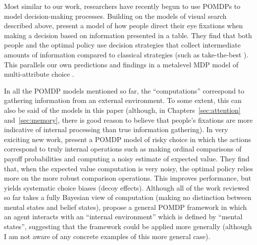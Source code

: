 Most similar to our work, researchers have recently begun to use POMDPs to model decision-making processes. Building on the models of visual search described above, \citet{chen2017cognitive} present a model of how people direct their eye fixations when making a decision based on information presented in a table. They find that both people and the optimal policy use decision strategies that collect intermediate amounts of information compared to classical strategies (such as take-the-best \citealp{gigerenzer1996reasoning}). This parallels our own predictions and findings in a metalevel MDP model of multi-attribute choice \citep{gul2018discovering}.

In all the POMDP models mentioned so far, the ``computations'' correspond to gathering information from an external environment. To some extent, this can also be said of the models in this paper (although, in Chapters~\ref{sec:attention} and~\ref{sec:memory}, there is good reason to believe that people's fixations are more indicative of internal processing than true information gathering). In very exiciting new work, \citet{chen2021apparently} present a POMDP model of risky choice in which the actions correspond to truly internal operations such as making ordinal comparisons of payoff probabilities and computing a noisy estimate of expected value. They find that, when the expected value computation is very noisy, the optimal policy relies more on the more robust comparison operations. This improves performance, but yields systematic choice biases (decoy effects). Although all of the work reviewed so far takes a fully Bayesian view of computation (making no distinction between mental states and belief states), \citet{oulasvirta2022computational} propose a general POMDP framework in which an agent interacts with an ``internal environment'' which is defined by ``mental states'', suggesting that the framework could be applied more generally (although I am not aware of any concrete examples of this more general case).

